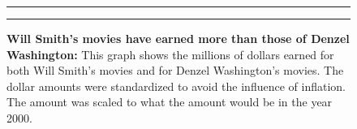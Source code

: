 \documentclass[]{article}
\begin{document}
\begin{figure}[!ht]
 \label{fig:one-graphic}
    \begin{center}
    \end{center}
    \hrule
      \vspace{2mm}
    \caption{ \textbf{Will Smith's movies have earned more than those of Denzel Washington:} \newline \footnotesize{ This graph shows the millions of dollars earned for both Will Smith's movies and for Denzel Washington's movies.  \newline \newline  The dollar amounts were standardized to avoid the influence of inflation. The amount was scaled to what the amount would be in the year 2000. }  }
    \vspace{2mm}
    \hrule
\end{figure}
\end{document}
